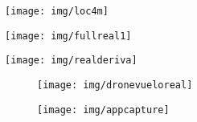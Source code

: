 \documentclass[notes,slidesec,a4]{seminar}
\begin{document}
\begin{hslide}

\begin{center}
	\begin{figure}
		\centering
		\texttt{[image: img/loc4m]}
	\end{figure}
\end{center}

\end{hslide}


\begin{hslide}

\begin{center}
	\begin{figure}
		\centering
		\texttt{[image: img/fullreal1]}
	\end{figure}
\end{center}

\end{hslide}


\begin{hslide}

\begin{center}
	\begin{figure}
		\centering
		\texttt{[image: img/realderiva]}
	\end{figure}
\end{center}

\end{hslide}

\begin{hslide}

\begin{center}
	\begin{figure}
		\centering
		\begin{subfigure}
			\centering
			\texttt{[image: img/dronevueloreal]}
		\end{subfigure}%
		\begin{subfigure}
			\centering
			\texttt{[image: img/appcapture]}
		\end{subfigure}
	\end{figure}
\end{center}

\end{hslide}
\end{document}
